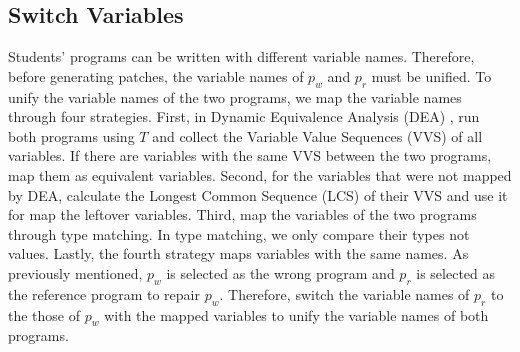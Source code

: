 \documentclass[10pt,conference]{IEEEtran}
\begin{document}
    \subsection{Switch Variables}\label{swtVariable}
        Students' programs can be written with different variable names. Therefore, before generating patches, the variable names of $p_{w}$ and $p_{r}$ must be unified. To unify the variable names of the two programs, we map the variable names through four strategies. First, in Dynamic Equivalence Analysis (DEA) \cite{hu2019re}, run both programs using $T$ and collect the Variable Value Sequences (VVS) of all variables. If there are variables with the same VVS between the two programs, map them as equivalent variables. Second, for the variables that were not mapped by DEA, calculate the Longest Common Sequence (LCS) of their VVS and use it for map the leftover variables. Third, map the variables of the two programs through type matching. In type matching, we only compare their types not values. Lastly, the fourth strategy maps variables with the same names. As previously mentioned, $p_{w}$ is selected as the wrong program and $p_{r}$ is selected as the reference program to repair $p_{w}$. Therefore, switch the variable names of $p_{r}$ to the those of $p_{w}$ with the mapped variables to unify the variable names of both programs.
\end{document}
